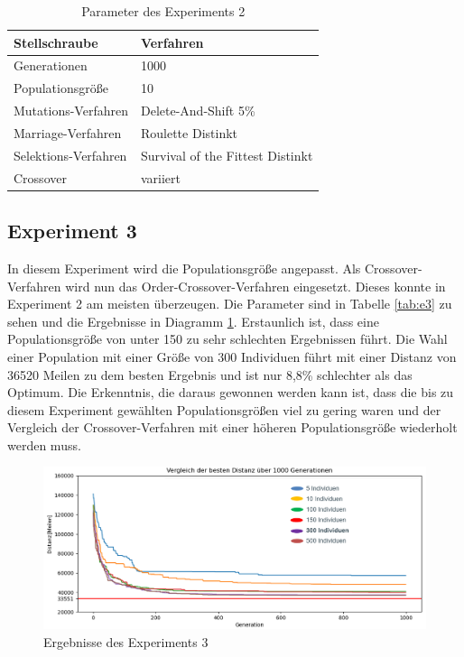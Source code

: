 \begin{table}[H]
\centering
\caption{Parameter des Experiments 2}
\begin{tabular}{ll}
Stellschraube & Verfahren \\
\hline
Generationen & 1000 \\
Populationsgröße & 10 \\
Mutations-Verfahren & Delete-And-Shift 5\% \\
Marriage-Verfahren & Roulette Distinkt \\
Selektions-Verfahren & Survival of the Fittest Distinkt \\
Crossover & variiert
\end{tabular}
\label{tab:e2}
\end{table}

\subsection{Experiment 3}
In diesem Experiment wird die Populationsgröße angepasst. Als Crossover-Verfahren wird nun das Order-Crossover-Verfahren eingesetzt. Dieses konnte in Experiment 2 am meisten überzeugen.
Die Parameter sind in Tabelle \ref{tab:e3} zu sehen und die Ergebnisse in Diagramm \ref{fig:experiment3}. Erstaunlich ist, dass eine Populationsgröße von unter 150 zu sehr schlechten Ergebnissen führt. Die Wahl einer Population mit einer Größe von 300 Individuen führt mit einer Distanz von 36520 Meilen zu dem besten Ergebnis und ist nur 8,8\% schlechter als das Optimum. Die Erkenntnis, die daraus gewonnen werden kann ist, dass die bis zu diesem Experiment gewählten Populationsgrößen viel zu gering waren und der Vergleich der Crossover-Verfahren mit einer höheren Populationsgröße wiederholt werden muss.

\begin{figure}[H]
\centering
\includegraphics[width=1\textwidth]{img/Vortrag/experiment3.png}
\caption{Ergebnisse des Experiments 3}
\label{fig:experiment3}
\end{figure}

